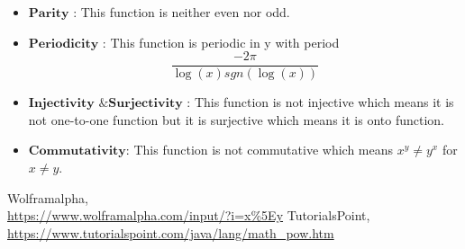 \documentclass[a4paper, 11pt]{article}
\begin{document}
\begin{itemize}
  \item $\boldsymbol{Parity}$ : This function is neither even nor odd.

  \item $\boldsymbol{Periodicity}$ : This function is periodic in y with period  \[\frac{-2\pi}{\log{(x)}sgn(\log{(x)})}\]
  
  \item $ \textbf{Injectivity \& Surjectivity}$ : This function is not injective which means it is not one-to-one function but it is surjective which means it is onto function.
  
   \item $\boldsymbol{Commutativity}$:  This function is not commutative which means $x^y \ne y^x $ for $x\ne y$.
  
\end{itemize}

\begin{thebibliography}{9}
Wolframalpha,\\
\url{https://www.wolframalpha.com/input/?i=x%5Ey}
TutorialsPoint,\\
\url{https://www.tutorialspoint.com/java/lang/math_pow.htm}
\end{thebibliography}
\end{document}
